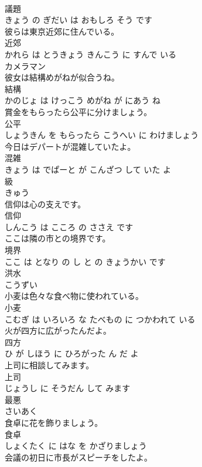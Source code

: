 \documentclass[8pt]{extreport}
\begin{document}
\begin{CJK}{UTF8}{min}
\\	議題 
\\	きょう の ぎだい は おもしろ そう です			
\\	彼らは東京近郊に住んでいる。	
\\	近郊 
\\	かれら は とうきょう きんこう に すんで いる			
\\	カメラマン	
\\	彼女は結構めがねが似合うね。	
\\	結構 
\\	かのじょ は けっこう めがね が にあう ね			
\\	賞金をもらったら公平に分けましょう。	
\\	公平 
\\	しょうきん を もらったら こうへい に わけましょう			
\\	今日はデパートが混雑していたよ。	
\\	混雑 
\\	きょう は でぱーと が こんざつ して いた よ			
\\	級	
\\	きゅう		
\\	信仰は心の支えです。	
\\	信仰 
\\	しんこう は こころ の ささえ です			
\\	ここは隣の市との境界です。	
\\	境界 
\\	ここ は となり の し と の きょうかい です			
\\	洪水	
\\	こうずい		
\\	小麦は色々な食べ物に使われている。	
\\	小麦 
\\	こむぎ は いろいろ な たべもの に つかわれて いる			
\\	火が四方に広がったんだよ。	
\\	四方 
\\	ひ が しほう に ひろがった ん だ よ			
\\	上司に相談してみます。	
\\	上司 
\\	じょうし に そうだん して みます			
\\	最悪	
\\	さいあく		
\\	食卓に花を飾りましょう。	
\\	食卓 
\\	しょくたく に はな を かざりましょう			
\\	会議の初日に市長がスピーチをしたよ。	

\end{CJK}
\end{document}
